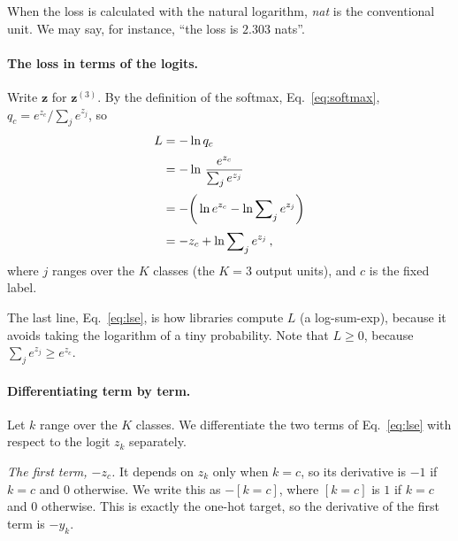 \documentclass[12pt]{article}
\numberwithin{equation}{section} %
\newcommand{\vc}[1]{\symbf{#1}}
\begin{document}
When the loss is calculated with the natural logarithm, \emph{nat} is the
conventional unit. We may say, for instance, ``the loss is $2.303$ nats''.

\paragraph{The loss in terms of the logits.}
Write $\vc{z}$ for $\vc{z}^{(3)}$. By the definition of the softmax,
Eq.~\eqref{eq:softmax}, $q_c=e^{z_c}/\sum_j e^{z_j}$, so
\begin{align}
    L &= -\ln q_c\label{eq:loss}\\[2pt]
      &= -\ln \, \dfrac{e^{z_c}}{\sum\nolimits_j e^{z_j}}\notag\\[2pt]
      &= -\bigg(\ln e^{z_c} - \ln \sum\nolimits_j e^{z_j}\bigg)\notag\\[2pt]
      &= -z_c + \ln \sum\nolimits_j e^{z_j}\, , \label{eq:lse} %
\end{align}
where $j$ ranges over the $K$ classes (the $K=3$ output units), and $c$ is
the fixed label.

The last line, Eq.~\eqref{eq:lse}, is how libraries compute $L$ (a
log-sum-exp), because it avoids taking the logarithm of a tiny probability.
Note that $L\ge0$, because $\sum_j e^{z_j}\ge e^{z_c}$.

\paragraph{Differentiating term by term.}
Let $k$ range over the $K$ classes. We differentiate the two terms of
Eq.~\eqref{eq:lse} with respect to the logit $z_k$ separately.

\emph{The first term, $-z_c$.} It depends on $z_k$ only when $k=c$, so its
derivative is $-1$ if $k=c$ and $0$ otherwise. We write this as $-[k{=}c]$,
where $[k{=}c]$ is $1$ if $k=c$ and $0$ otherwise. This is exactly the one-hot
target, so the derivative of the first term is $-y_k$.
\end{document}

